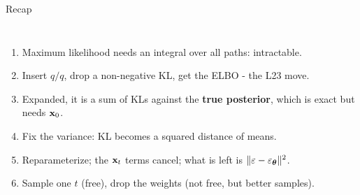 \documentclass[aspectratio=169]{beamer}
\begin{document}
\begin{frame}{Recap}
  \small
  \begin{columns}[T]
    \begin{enumerate}\setlength\itemsep{2pt}
      \item Maximum likelihood needs an integral over all paths: intractable.
      \item Insert $q/q$, drop a non-negative KL, get the ELBO - the L23 move.
      \item Expanded, it is a sum of KLs against the \textbf{true posterior}, which is
        exact but needs $\mathbf{x}_0$.
      \item Fix the variance: KL becomes a squared distance of means.
      \item Reparameterize; the $\mathbf{x}_t$ terms cancel; what is left is
        $\|\varepsilon-\varepsilon_{\bm{\theta}}\|^2$.
      \item Sample one $t$ (free), drop the weights (not free, but better samples).
    \end{enumerate}
    \vskip 6pt
  \end{columns}
\end{frame}
\end{document}
